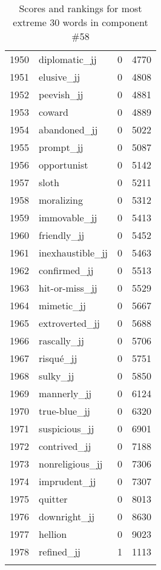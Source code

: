 \begin{longtable}[!htbp]{| rlr@{.}l |}
    1950 & diplomatic\_jj & 0 & 4770 \\
    1951 & elusive\_jj & 0 & 4808 \\
    1952 & peevish\_jj & 0 & 4881 \\
    1953 & coward & 0 & 4889 \\
    1954 & abandoned\_jj & 0 & 5022 \\
    1955 & prompt\_jj & 0 & 5087 \\
    1956 & opportunist & 0 & 5142 \\
    1957 & sloth & 0 & 5211 \\
    1958 & moralizing & 0 & 5312 \\
    1959 & immovable\_jj & 0 & 5413 \\
    1960 & friendly\_jj & 0 & 5452 \\
    1961 & inexhaustible\_jj & 0 & 5463 \\
    1962 & confirmed\_jj & 0 & 5513 \\
    1963 & hit-or-miss\_jj & 0 & 5529 \\
    1964 & mimetic\_jj & 0 & 5667 \\
    1965 & extroverted\_jj & 0 & 5688 \\
    1966 & rascally\_jj & 0 & 5706 \\
    1967 & risqué\_jj & 0 & 5751 \\
    1968 & sulky\_jj & 0 & 5850 \\
    1969 & mannerly\_jj & 0 & 6124 \\
    1970 & true-blue\_jj & 0 & 6320 \\
    1971 & suspicious\_jj & 0 & 6901 \\
    1972 & contrived\_jj & 0 & 7188 \\
    1973 & nonreligious\_jj & 0 & 7306 \\
    1974 & imprudent\_jj & 0 & 7307 \\
    1975 & quitter & 0 & 8013 \\
    1976 & downright\_jj & 0 & 8630 \\
    1977 & hellion & 0 & 9023 \\
    1978 & refined\_jj & 1 & 1113 \\
    \hline
    \caption{Scores and rankings for most extreme 30 words in component \#58} \\
\end{longtable}
